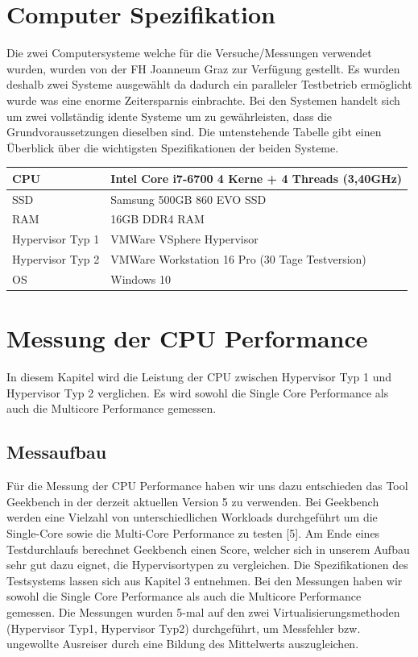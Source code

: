 \documentclass[conference]{IEEEtran}
\begin{document}
\section{Computer Spezifikation}
\label{Computer Spezifikation}
Die zwei Computersysteme welche für die Versuche/Messungen verwendet wurden, wurden von der FH Joanneum Graz zur Verfügung gestellt. Es wurden deshalb zwei Systeme ausgewählt da dadurch ein paralleler Testbetrieb ermöglicht wurde was eine enorme Zeitersparnis einbrachte. Bei den Systemen handelt sich um zwei vollständig idente Systeme um zu gewährleisten, dass die Grundvoraussetzungen dieselben sind. Die untenstehende Tabelle gibt einen Überblick über die wichtigsten Spezifikationen der beiden Systeme.

\begin{table}[]
\begin{tabular}{|l|l|}
\hline
CPU              & Intel Core i7-6700 4 Kerne + 4 Threads (3,40GHz) \\ \hline
SSD              & Samsung 500GB 860 EVO SSD                        \\ \hline
RAM              & 16GB DDR4 RAM                                    \\ \hline
Hypervisor Typ 1 & VMWare VSphere Hypervisor                        \\ \hline
Hypervisor Typ 2 & VMWare Workstation 16 Pro (30 Tage Testversion)  \\ \hline
OS               & Windows 10                                       \\ \hline
\end{tabular}
\end{table}

\section{Messung der CPU Performance}
\label{Messung der CPU Performance}
In diesem Kapitel wird die Leistung der CPU zwischen Hypervisor Typ 1 und Hypervisor Typ 2 verglichen. Es wird sowohl die Single Core Performance als auch die Multicore Performance gemessen.

\subsection{Messaufbau}
Für die Messung der CPU Performance haben wir uns dazu entschieden das Tool Geekbench in der derzeit aktuellen Version 5 zu verwenden. Bei Geekbench werden eine Vielzahl von unterschiedlichen Workloads durchgeführt um die Single-Core sowie die Multi-Core Performance zu testen [5]. Am Ende eines Testdurchlaufs berechnet Geekbench einen Score, welcher sich in unserem Aufbau sehr gut dazu eignet, die Hypervisortypen zu vergleichen. Die Spezifikationen des Testsystems lassen sich aus Kapitel 3 entnehmen.
Bei den Messungen haben wir sowohl die Single Core Performance als auch die Multicore Performance gemessen.  Die Messungen wurden 5-mal auf den zwei Virtualisierungsmethoden (Hypervisor Typ1, Hypervisor Typ2) durchgeführt, um Messfehler bzw. ungewollte Ausreiser durch eine Bildung des Mittelwerts auszugleichen.
\end{document}

